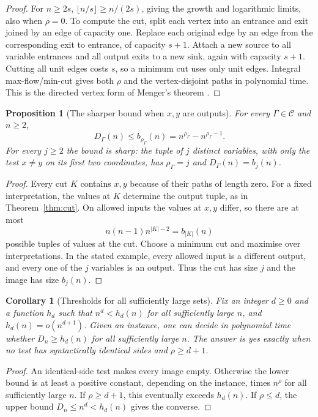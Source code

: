 \documentclass[12pt]{article}
\newtheorem{proposition}[theorem]{Proposition}
\newtheorem{corollary}[theorem]{Corollary}
\theoremstyle{definition}
\newcommand{\DD}{D}
\begin{document}
\begin{proof}
For $n\ge2s$, $\lfloor n/s\rfloor\ge n/(2s)$, giving the growth
and logarithmic limits, also when $\rho=0$. To compute the cut, split
each vertex into an entrance and exit joined by an edge of capacity one.
Replace each original edge by an edge from the corresponding exit to
entrance, of capacity $s+1$. Attach a new source to all variable
entrances and all output exits to a new sink, again with capacity
$s+1$. Cutting all unit edges costs $s$, so a minimum cut uses only
unit edges. Integral max-flow/min-cut gives both $\rho$ and the
vertex-disjoint paths in polynomial time. This is the directed vertex
form of Menger's theorem \cite{Menger}.
\end{proof}

\begin{proposition}[The sharper bound when $x,y$ are outputs]\label{prop:sharp-cut}
For every $\Gamma\in\mathcal C$ and $n\ge2$,
\[
 D_\Gamma(n)\le b_{\rho_\Gamma}(n)
                  =n^{\rho_\Gamma}-n^{\rho_\Gamma-1}.
\]
For every $j\ge2$ the bound is sharp: the tuple of $j$ distinct variables,
with only the test $x\ne y$ on its first two coordinates, has
$\rho_\Gamma=j$ and $D_\Gamma(n)=b_j(n)$.
\end{proposition}
\begin{proof}
Every cut $K$ contains $x,y$ because of their paths of length zero.
For a fixed interpretation, the values at $K$ determine the output
tuple, as in Theorem~\ref{thm:cut}. On allowed inputs the values at
$x,y$ differ, so there are at most
\[
 n(n-1)n^{|K|-2}=b_{|K|}(n)
\]
possible tuples of values at the cut. Choose a minimum cut and maximise
over interpretations. In the stated example, every allowed input is
a different output, and every one of the $j$ variables is an output.
Thus the cut has size $j$ and the image has size $b_j(n)$.
\end{proof}

\begin{corollary}[Thresholds for all sufficiently large sets]\label{cor:eventual}
Fix an integer $d\ge0$ and a function $h_d$ such that
$n^d<h_d(n)$ for all sufficiently large $n$, and
$h_d(n)=o(n^{d+1})$. Given an instance, one can decide in polynomial
time whether $\DD_n\ge h_d(n)$ for all sufficiently large $n$.
The answer is yes exactly when no test has syntactically identical
sides and $\rho\ge d+1$.
\end{corollary}
\begin{proof}
An identical-side test makes every image empty. Otherwise the lower
bound is at least a positive constant, depending on the instance,
times $n^\rho$ for all sufficiently large $n$. If $\rho\ge d+1$,
this eventually exceeds $h_d(n)$. If $\rho\le d$, the upper bound
$\DD_n\le n^d<h_d(n)$ gives the converse.
\end{proof}
\end{document}

